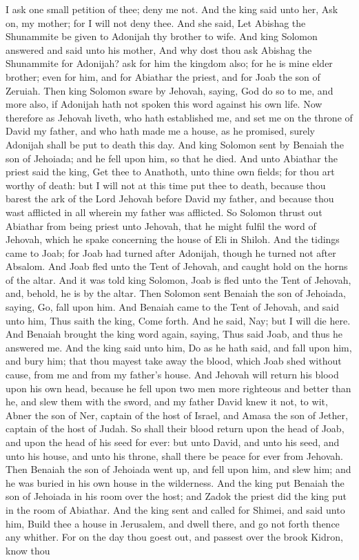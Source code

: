 I ask one small petition of thee; deny me not. And the king said unto her, Ask on, my mother; for I will not deny thee. And she said, Let Abishag the Shunammite be given to Adonijah thy brother to wife. And king Solomon answered and said unto his mother, And why dost thou ask Abishag the Shunammite for Adonijah? ask for him the kingdom also; for he is mine elder brother; even for him, and for Abiathar the priest, and for Joab the son of Zeruiah. Then king Solomon sware by Jehovah, saying, God do so to me, and more also, if Adonijah hath not spoken this word against his own life. Now therefore as Jehovah liveth, who hath established me, and set me on the throne of David my father, and who hath made me a house, as he promised, surely Adonijah shall be put to death this day. And king Solomon sent by Benaiah the son of Jehoiada; and he fell upon him, so that he died.  And unto Abiathar the priest said the king, Get thee to Anathoth, unto thine own fields; for thou art worthy of death: but I will not at this time put thee to death, because thou barest the ark of the Lord Jehovah before David my father, and because thou wast afflicted in all wherein my father was afflicted. So Solomon thrust out Abiathar from being priest unto Jehovah, that he might fulfil the word of Jehovah, which he spake concerning the house of Eli in Shiloh.  And the tidings came to Joab; for Joab had turned after Adonijah, though he turned not after Absalom. And Joab fled unto the Tent of Jehovah, and caught hold on the horns of the altar. And it was told king Solomon, Joab is fled unto the Tent of Jehovah, and, behold, he is by the altar. Then Solomon sent Benaiah the son of Jehoiada, saying, Go, fall upon him. And Benaiah came to the Tent of Jehovah, and said unto him, Thus saith the king, Come forth. And he said, Nay; but I will die here. And Benaiah brought the king word again, saying, Thus said Joab, and thus he answered me. And the king said unto him, Do as he hath said, and fall upon him, and bury him; that thou mayest take away the blood, which Joab shed without cause, from me and from my father’s house. And Jehovah will return his blood upon his own head, because he fell upon two men more righteous and better than he, and slew them with the sword, and my father David knew it not, to wit, Abner the son of Ner, captain of the host of Israel, and Amasa the son of Jether, captain of the host of Judah. So shall their blood return upon the head of Joab, and upon the head of his seed for ever: but unto David, and unto his seed, and unto his house, and unto his throne, shall there be peace for ever from Jehovah. Then Benaiah the son of Jehoiada went up, and fell upon him, and slew him; and he was buried in his own house in the wilderness. And the king put Benaiah the son of Jehoiada in his room over the host; and Zadok the priest did the king put in the room of Abiathar.  And the king sent and called for Shimei, and said unto him, Build thee a house in Jerusalem, and dwell there, and go not forth thence any whither. For on the day thou goest out, and passest over the brook Kidron, know thou 